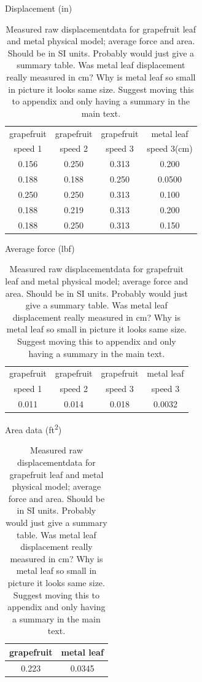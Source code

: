 \begin{table}
\caption{Measured raw displacementdata for grapefruit leaf and metal physical model; average force and area. Should be in SI units. Probably would just give a summary table. Was metal leaf displacement really measured in \si{\centi\meter}? Why is metal leaf so small in picture it looks same size. Suggest moving this to appendix and only having a summary in the main text.}
\label{tbl:results1}

\begin{center}
Displacement (\si{in})\\
\begin{tabular}{cccc}
\toprule
grapefruit & grapefruit & grapefruit & metal leaf \\
speed 1 & speed 2 & speed 3 & speed 3(cm) \\ 
\midrule
0.156 & 0.250 & 0.313 & 0.200 \\
0.188 & 0.188 & 0.250 & 0.0500 \\
0.250 & 0.250 & 0.313 & 0.100 \\
0.188 & 0.219 & 0.313 & 0.200 \\
0.188 & 0.250 & 0.313 & 0.150 \\
\bottomrule
\end{tabular}
\end{center}

\begin{center}
Average force (\si{lbf})\\
\begin{tabular}{cccc}
\toprule
grapefruit & grapefruit & grapefruit & metal leaf \\
speed 1 & speed 2 & speed 3 & speed 3 \\
\midrule
0.011 & 0.014 & 0.018 & 0.0032\\
\bottomrule
\end{tabular}
\end{center}

\begin{center}
Area data (\si{ft\squared})\\
\begin{tabular}{cc}
\toprule
grapefruit & metal leaf \\ %
\midrule
0.223 & 0.0345 \\ %
\bottomrule
\end{tabular}
\end{center}
\end{table}



